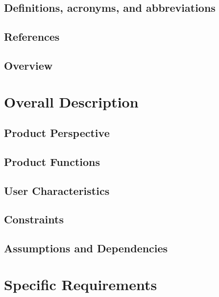\documentclass{scrreprt}
\begin{document}
\section{Definitions, acronyms, and abbreviations}


\section{References}


\section{Overview}



\chapter{Overall Description}

\section{Product Perspective}


\section{Product Functions}


\section{User Characteristics}


\section{Constraints}


\section{Assumptions and Dependencies}



\chapter{Specific Requirements}
\end{document}
